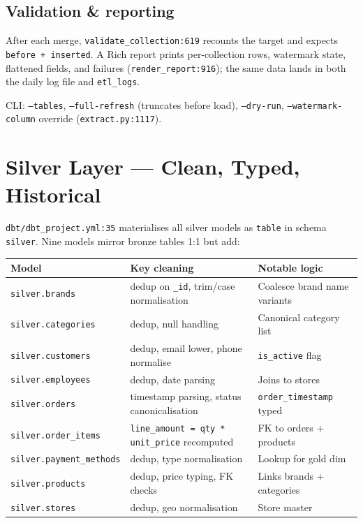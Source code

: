 \documentclass[11pt,a4paper]{article}
\begin{document}
\subsection{Validation \& reporting}
After each merge, \texttt{validate\_collection:619} recounts the target and expects \texttt{before + inserted}. A Rich report prints per-collection rows, watermark state, flattened fields, and failures (\texttt{render\_report:916}); the same data lands in both the daily log file and \texttt{etl\_logs}.

CLI: \texttt{--tables}, \texttt{--full-refresh} (truncates before load), \texttt{--dry-run}, \texttt{--watermark-column} override (\texttt{extract.py:1117}).

\section{Silver Layer — Clean, Typed, Historical}

\texttt{dbt/dbt\_project.yml:35} materialises all silver models as \texttt{table} in schema \texttt{silver}. Nine models mirror bronze tables 1:1 but add:

\begin{center}
\begin{longtable}{l l l}
\toprule
Model & Key cleaning & Notable logic \\
\midrule
\endhead
\texttt{silver.brands} & dedup on \texttt{\_id}, trim/case normalisation & Coalesce brand name variants \\
\texttt{silver.categories} & dedup, null handling & Canonical category list \\
\texttt{silver.customers} & dedup, email lower, phone normalise & \texttt{is\_active} flag \\
\texttt{silver.employees} & dedup, date parsing & Joins to stores \\
\texttt{silver.orders} & timestamp parsing, status canonicalisation & \texttt{order\_timestamp} typed \\
\texttt{silver.order\_items} & \texttt{line\_amount = qty * unit\_price} recomputed & FK to orders + products \\
\texttt{silver.payment\_methods} & dedup, type normalisation & Lookup for gold dim \\
\texttt{silver.products} & dedup, price typing, FK checks & Links brands + categories \\
\texttt{silver.stores} & dedup, geo normalisation & Store master \\
\bottomrule
\end{longtable}
\end{center}
\end{document}
